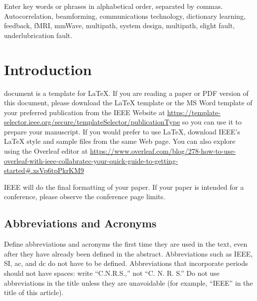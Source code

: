 \documentclass{ieeeaccess}
\begin{document}
\begin{keywords}
Enter key words or phrases in alphabetical
order, separated by commas. Autocorrelation, beamforming, communications technology, dictionary learning, feedback, fMRI, mmWave, multipath, system design, multipath, slight fault, underlubrication fault.
\end{keywords}

\titlepgskip=-21pt

\maketitle












\section{Introduction}
\label{sec:introduction}
 document is a template for \LaTeX. If you are reading a paper or PDF version of this document, please download the LaTeX template or the MS Word
template of your preferred publication from the IEEE Website at \underline
{https://template-selector.ieee.org/secure/templateSelec}\break\underline{tor/publicationType} so you can use it to prepare your manuscript. 
If you would prefer to use LaTeX, download IEEE's LaTeX style and sample files
from the same Web page. You can also explore using the Overleaf editor at
\underline
{https://www.overleaf.com/blog/278-how-to-use-overleaf-}\break\underline{with-ieee-collabratec-your-quick-guide-to-getting-started}\break\underline{\#.xsVp6tpPkrKM9}

IEEE will do the final formatting of your paper. If your paper is intended
for a conference, please observe the conference page limits.

\subsection{Abbreviations and Acronyms}
Define abbreviations and acronyms the first time they are used in the text,
even after they have already been defined in the abstract. Abbreviations
such as IEEE, SI, ac, and dc do not have to be defined. Abbreviations that
incorporate periods should not have spaces: write ``C.N.R.S.,'' not ``C. N.
R. S.'' Do not use abbreviations in the title unless they are unavoidable
(for example, ``IEEE'' in the title of this article).
\end{document}
